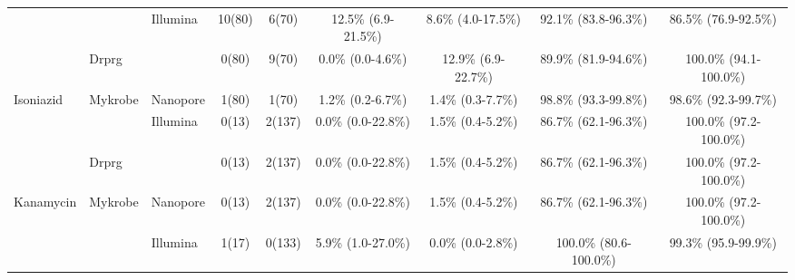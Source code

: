 \begin{table}
{\begin{tabular}{|l|l|l|c|c|c|c|c|c|}
                                &                         & Illumina                   & \cellcolor[HTML]{EFEFEF}10(80) & \cellcolor[HTML]{EFEFEF}6(70)   & \cellcolor[HTML]{EFEFEF}12.5\% (6.9-21.5\%) & \cellcolor[HTML]{EFEFEF}8.6\% (4.0-17.5\%)  & \cellcolor[HTML]{EFEFEF}92.1\% (83.8-96.3\%)   & \cellcolor[HTML]{EFEFEF}86.5\% (76.9-92.5\%)   \\ \cline{3-9} 
                                & \multirow{-2}{*}{Drprg} &                            & 0(80)                          & 9(70)                           & 0.0\% (0.0-4.6\%)                           & 12.9\% (6.9-22.7\%)                         & 89.9\% (81.9-94.6\%)                           & 100.0\% (94.1-100.0\%)                         \\ \cline{2-2} \cline{4-9} 
\multirow{-3}{*}{Isoniazid}     & Mykrobe                 & \multirow{-2}{*}{Nanopore} & \cellcolor[HTML]{EFEFEF}1(80)  & \cellcolor[HTML]{EFEFEF}1(70)   & \cellcolor[HTML]{EFEFEF}1.2\% (0.2-6.7\%)   & \cellcolor[HTML]{EFEFEF}1.4\% (0.3-7.7\%)   & \cellcolor[HTML]{EFEFEF}98.8\% (93.3-99.8\%)   & \cellcolor[HTML]{EFEFEF}98.6\% (92.3-99.7\%)   \\ \hline
                                &                         & Illumina                   & 0(13)                          & 2(137)                          & 0.0\% (0.0-22.8\%)                          & 1.5\% (0.4-5.2\%)                           & 86.7\% (62.1-96.3\%)                           & 100.0\% (97.2-100.0\%)                         \\ \cline{3-9} 
                                & \multirow{-2}{*}{Drprg} &                            & \cellcolor[HTML]{EFEFEF}0(13)  & \cellcolor[HTML]{EFEFEF}2(137)  & \cellcolor[HTML]{EFEFEF}0.0\% (0.0-22.8\%)  & \cellcolor[HTML]{EFEFEF}1.5\% (0.4-5.2\%)   & \cellcolor[HTML]{EFEFEF}86.7\% (62.1-96.3\%)   & \cellcolor[HTML]{EFEFEF}100.0\% (97.2-100.0\%) \\ \cline{2-2} \cline{4-9} 
\multirow{-3}{*}{Kanamycin}     & Mykrobe                 & \multirow{-2}{*}{Nanopore} & 0(13)                          & 2(137)                          & 0.0\% (0.0-22.8\%)                          & 1.5\% (0.4-5.2\%)                           & 86.7\% (62.1-96.3\%)                           & 100.0\% (97.2-100.0\%)                         \\ \hline
                                &                         & Illumina                   & \cellcolor[HTML]{EFEFEF}1(17)  & \cellcolor[HTML]{EFEFEF}0(133)  & \cellcolor[HTML]{EFEFEF}5.9\% (1.0-27.0\%)  & \cellcolor[HTML]{EFEFEF}0.0\% (0.0-2.8\%)   & \cellcolor[HTML]{EFEFEF}100.0\% (80.6-100.0\%) & \cellcolor[HTML]{EFEFEF}99.3\% (95.9-99.9\%)   \\ \cline{3-9} 

\end{tabular}}
\end{table}
